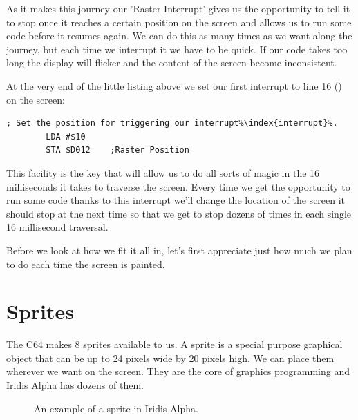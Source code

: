 As it makes this journey our 'Raster Interrupt' gives
us the opportunity to tell it to stop once it reaches a certain position on the screen
and allows us to run some code before it resumes again. We can do this as many times as
we want along the journey, but each time we interrupt it we have to be quick. If our code
takes too long the display will flicker and the content of the screen become inconsistent.

At the very end of the little listing above we set our first interrupt to line 16 () on the screen:
\clearpage

\begin{lstlisting}[caption=In \icode{InitializeSpritesAndInterruptsForTitleScreen\index{InitializeSpritesAndInterruptsForTitleScreen}},escapechar=\%]
        ; Set the position for triggering our interrupt%\index{interrupt}%.
        LDA #$10
        STA $D012    ;Raster Position
\end{lstlisting}

This facility is the key that will allow us to do all sorts of magic in the 16 milliseconds
it takes to traverse the screen. Every time we get the opportunity to run some code thanks
to this interrupt we'll change the location of the screen it should stop at the next time
so that we get to stop dozens of times in each single 16 millisecond traversal.

Before we look at how we fit it all in, let's first appreciate just how much we plan to
do each time the screen is painted.

\section{Sprites}
The C64 makes 8 sprites available to us. A sprite is a special purpose graphical object that
can be up to 24 pixels wide by 20 pixels high. We can place them wherever we want on the
screen. They are the core of graphics programming and Iridis Alpha has dozens of them. 

\begin{figure}[H]
  {
    \setlength{\tabcolsep}{1.0pt}
    \setlength\cmidrulewidth{\heavyrulewidth} %
    \begin{adjustbox}{width=4cm,center}
	\begin{subfigure}{0.3\textwidth}
    \def\MULTICOLORONE{red}
    \def\MULTICOLORTWO{white}
    \def\SPRITECOLOR{blue}
		
	\end{subfigure}
    \end{adjustbox}
  }\caption{An example of a sprite in Iridis Alpha.}
\end{figure}


